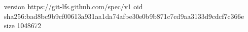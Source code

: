 version https://git-lfs.github.com/spec/v1
oid sha256:bad8bc9b9cf00613a931aa1da74afbe30e0b9b871c7cd9aa3133d9cdcf7c366e
size 1048672
